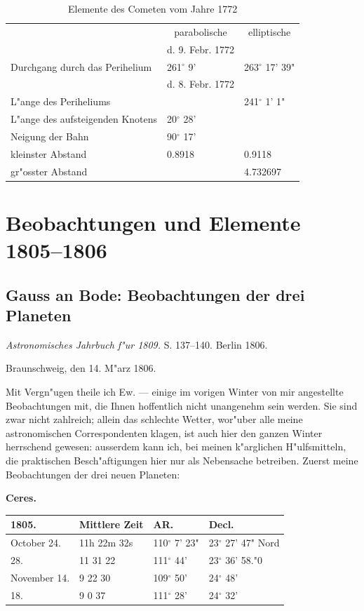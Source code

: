 \documentclass[12pt,a4paper]{article}
\begin{document}
\begin{table}[H]
\centering
\begin{tabular}{l l l}
\toprule
& \multicolumn{1}{c}{parabolische} & \multicolumn{1}{c}{elliptische} \\
& \multicolumn{1}{c}{d. 9. Febr. 1772} & \\
\midrule
Durchgang durch das Perihelium & 261$^\circ$ 9' & 263$^\circ$ 17' 39" \\
& d. 8. Febr. 1772 & \\
L"ange des Periheliums & & 241$^\circ$ 1' 1" \\
L"ange des aufsteigenden Knotens & 20$^\circ$ 28' & \\
Neigung der Bahn & 90$^\circ$ 17' & \\
kleinster Abstand & 0.8918 & 0.9118 \\
gr"osster Abstand & & 4.732697 \\
\bottomrule
\end{tabular}
\caption{Elemente des Cometen vom Jahre 1772}
\end{table}

\section{Beobachtungen und Elemente 1805--1806}

\subsection{Gauss an Bode: Beobachtungen der drei Planeten}

\textit{Astronomisches Jahrbuch f"ur 1809.} S. 137--140. Berlin 1806.

Braunschweig, den 14. M"arz 1806.

Mit Vergn"ugen theile ich Ew. --- einige im vorigen Winter von mir angestellte Beobachtungen mit, die Ihnen hoffentlich nicht unangenehm sein werden. Sie sind zwar nicht zahlreich; allein das schlechte Wetter, wor"uber alle meine astronomischen Correspondenten klagen, ist auch hier den ganzen Winter herrschend gewesen: ausserdem kann ich, bei meinen k"arglichen H"ulfsmitteln, die praktischen Besch"aftigungen hier nur als Nebensache betreiben. Zuerst meine Beobachtungen der drei neuen Planeten:

\textbf{Ceres.}

\begin{table}[H]
\centering
\begin{tabular}{l l l l}
\toprule
1805. & Mittlere Zeit & AR. & Decl. \\
\midrule
October 24. & 11h 22m 32s & 110$^\circ$ 7' 23" & 23$^\circ$ 27' 47" Nord \\
28. & 11 31 22 & 111$^\circ$ 44' & 23$^\circ$ 36' 58."0 \\
November 14. & 9 22 30 & 109$^\circ$ 50' & 24$^\circ$ 48' \\
18. & 9 0 37 & 111$^\circ$ 28' & 24$^\circ$ 32' \\
\bottomrule
\end{tabular}
\end{table}
\end{document}
